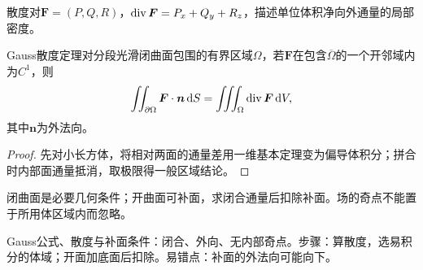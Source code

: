\begin{definition}{散度}对$\bm F=(P,Q,R)$，$\operatorname{div}\bm F=P_x+Q_y+R_z$，描述单位体积净向外通量的局部密度。\end{definition}
\begin{theorem}{Gauss散度定理}对分段光滑闭曲面包围的有界区域$\Omega$，若$\bm F$在包含$\overline\Omega$的一个开邻域内为$C^1$，则
\begin{equation}\iint_{\partial\Omega}\bm F\cdot\bm n\mathop{}\!\mathrm{d} S=\iiint_\Omega\operatorname{div}\bm F\mathop{}\!\mathrm{d} V,\end{equation}
其中$\bm n$为外法向。\end{theorem}
\begin{proof}先对小长方体，将相对两面的通量差用一维基本定理变为偏导体积分；拼合时内部面通量抵消，取极限得一般区域结论。\end{proof}
闭曲面是必要几何条件；开曲面可补面，求闭合通量后扣除补面。场的奇点不能置于所用体区域内而忽略。

\begin{method}{Gauss公式、散度与补面}条件：闭合、外向、无内部奇点。步骤：算散度，选易积分的体域；开面加底面后扣除。易错点：补面的外法向可能向下。\end{method}
